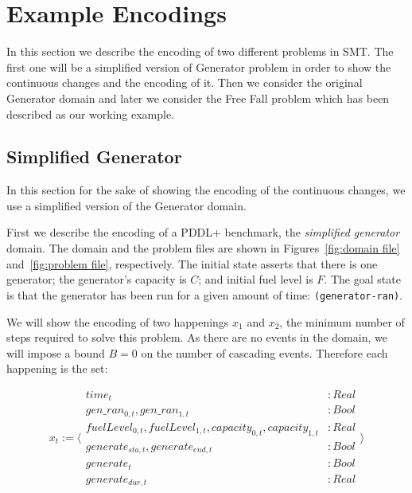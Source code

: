 \section{Example Encodings}\label{sec:example_encodings}

In this section we describe the encoding of two different problems in SMT. The first one will be a simplified version of Generator problem in order to show the continuous changes and the encoding of it. Then we consider the original Generator domain and later we consider the Free Fall problem which has been described as our working example.


\subsection{Simplified Generator}

In this section for the sake of showing the encoding of the continuous changes, we use a simplified version of the Generator domain. 

First we describe the encoding of a PDDL+ benchmark, the \textit{ simplified generator} domain. The domain and the problem files are shown in Figures~\ref{fig:domain file} and~\ref{fig:problem file}, respectively. The initial state asserts that there is one generator; the generator's capacity is $C$; and initial fuel level is $F$. The goal state is that the generator has been run for a given amount of time: \texttt{(generator-ran)}.

We will show the encoding of two happenings $x_1$ and $x_2$, the minimum number of steps required to solve this problem. As there are no events in the domain, we will impose a bound $B=0$ on the number of cascading events. Therefore each happening is the set:

$$
x_t := \Bigg \langle
\begin{array}{lr}
time_t &:Real \\
gen\_ran_{0,t}, gen\_ran_{1,t} &:Bool \\
fuelLevel_{0,t}, fuelLevel_{1,t}, capacity_{0,t}, capacity_{1,t} &:Real \\
generate_{sta,t}, generate_{end,t} &:Bool \\
generate_t &:Bool\\
generate_{dur,t} &:Real
\end{array}
\Bigg \rangle
$$

